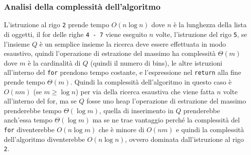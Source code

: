 \subsubsection{Analisi della complessità dell'algoritmo}
L'istruzione al rigo \texttt{2} prende tempo $ O(n \log{}n) $ dove $ n $ è la lunghezza della lista di oggetti, il for delle righe \texttt{4 - 7} viene eseguito $ n $
volte, l'istruzione del rigo \texttt{5}, se l'insieme $ Q $ è un semplice insieme la ricerca deve essere effettuata in modo esaustivo, quindi l'operazione di estrazione del 
massimo ha complessità $ \Theta(m) $ dove $ m $ è la cardinalità di $ Q $ (quindi il numero di bins), le altre istruzioni all'interno del \texttt{for} prendono tempo costante, e 
l'espressione nel \texttt{return} alla fine prende tempo $ \Theta(m) $. Quindi la complessità dell'algoritmo in questo caso è $ O(nm) $ (se $ m \geq \log{}n $) per via della 
ricerca esaustiva che viene fatta $ n $ volte all'interno del for, ma se $ Q $ fosse uno heap l'operazione di estrazione del massimo prenderebbe tempo $ \Theta(\log{}m) $, 
quella di inserimento in $ Q $ prenderebbe anch'essa tempo $ \Theta(\log{}m) $ ma se ne trae vantaggio perché la complessità del \texttt{for} diventerebbe $ O(n \log{}m) $ che è minore di $ O(nm) $
e quindi la complessità dell'algoritmo diventerebbe $ O(n \log{}n) $, ovvero dominata dall'istruzione al rigo \texttt{2}.

